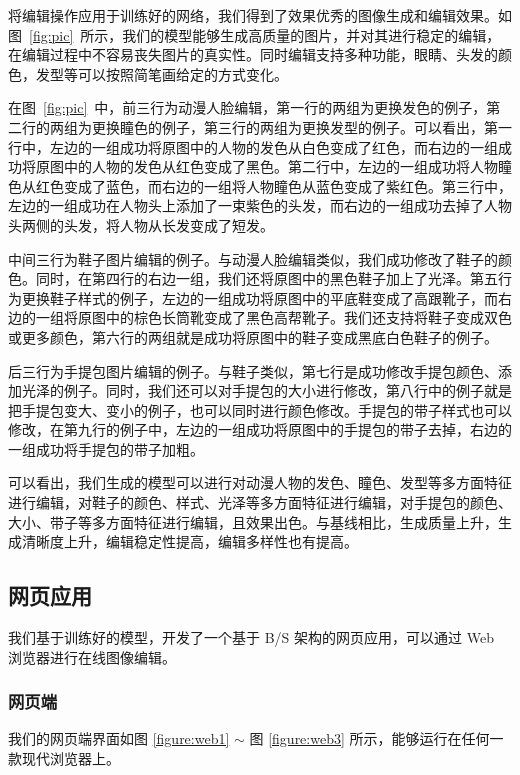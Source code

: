 \documentclass[a4paper,12pt,UTF8]{ctexart}
\begin{document}

将编辑操作应用于训练好的网络，我们得到了效果优秀的图像生成和编辑效果。如图~\ref{fig:pic}~所示，我们的模型能够生成高质量的图片，并对其进行稳定的编辑，在编辑过程中不容易丧失图片的真实性。同时编辑支持多种功能，眼睛、头发的颜色，发型等可以按照简笔画给定的方式变化。

在图~\ref{fig:pic}~中，前三行为动漫人脸编辑，第一行的两组为更换发色的例子，第二行的两组为更换瞳色的例子，第三行的两组为更换发型的例子。可以看出，第一行中，左边的一组成功将原图中的人物的发色从白色变成了红色，而右边的一组成功将原图中的人物的发色从红色变成了黑色。第二行中，左边的一组成功将人物瞳色从红色变成了蓝色，而右边的一组将人物瞳色从蓝色变成了紫红色。第三行中，左边的一组成功在人物头上添加了一束紫色的头发，而右边的一组成功去掉了人物头两侧的头发，将人物从长发变成了短发。

中间三行为鞋子图片编辑的例子。与动漫人脸编辑类似，我们成功修改了鞋子的颜色。同时，在第四行的右边一组，我们还将原图中的黑色鞋子加上了光泽。第五行为更换鞋子样式的例子，左边的一组成功将原图中的平底鞋变成了高跟靴子，而右边的一组将原图中的棕色长筒靴变成了黑色高帮靴子。我们还支持将鞋子变成双色或更多颜色，第六行的两组就是成功将原图中的鞋子变成黑底白色鞋子的例子。

后三行为手提包图片编辑的例子。与鞋子类似，第七行是成功修改手提包颜色、添加光泽的例子。同时，我们还可以对手提包的大小进行修改，第八行中的例子就是把手提包变大、变小的例子，也可以同时进行颜色修改。手提包的带子样式也可以修改，在第九行的例子中，左边的一组成功将原图中的手提包的带子去掉，右边的一组成功将手提包的带子加粗。

可以看出，我们生成的模型可以进行对动漫人物的发色、瞳色、发型等多方面特征进行编辑，对鞋子的颜色、样式、光泽等多方面特征进行编辑，对手提包的颜色、大小、带子等多方面特征进行编辑，且效果出色。与基线相比，生成质量上升，生成清晰度上升，编辑稳定性提高，编辑多样性也有提高。

\subsection{网页应用}

我们基于训练好的模型，开发了一个基于 B/S 架构的网页应用，可以通过 Web 浏览器进行在线图像编辑。

\subsubsection{网页端}
我们的网页端界面如图 \ref{figure:web1} $\sim$ 图 \ref{figure:web3}  所示，能够运行在任何一款现代浏览器上。
\end{document}
